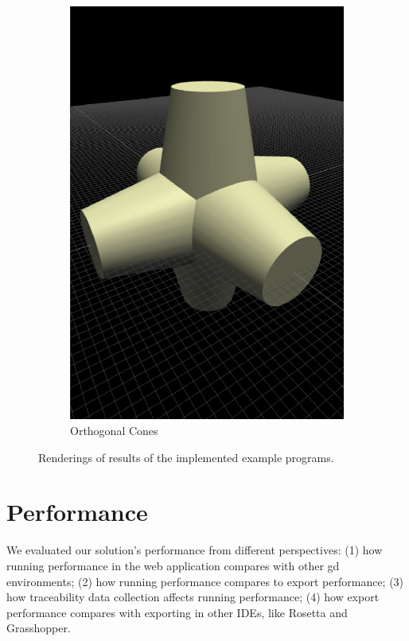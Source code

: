 \begin{figure}
\begin{subfigure}[b]{0.32\linewidth}
    \includegraphics[width=1.0\linewidth]{./images/all_examples/ortho_cones_crop}
    \caption{Orthogonal Cones}
    \label{fig:ex:ortho:cones}
  \end{subfigure}

  \caption{Renderings of results of the implemented example programs.}
  \label{fig:all:examples}
\end{figure}


\section{Performance}
\label{sec:eval:performance}
We evaluated our solution's performance from different perspectives:
(1) how running performance in the web application compares with other \gls{gd} environments;
(2) how running performance compares to export performance;
(3) how traceability data collection affects running performance;
(4) how export performance compares with exporting in other IDEs, like Rosetta and Grasshopper.


